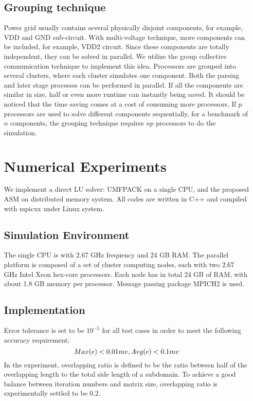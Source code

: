 \documentclass{sig-alternate}
\begin{document}
  \subsection{Grouping technique} 
	Power grid usually contains several physically disjoint components, for example, VDD and GND sub-circuit. With multi-voltage 
	technique, more components can be included, for example, VDD2 circuit. Since these components are totally independent, they can
	be solved in parallel. We utilize the group collective 
	communication technique to implement this idea. Processors are grouped into several clusters, where each cluster 
	simulates one component. Both the parsing and later stage processes can be performed in parallel. 
	If all the components are similar in size, half or even more runtime can instantly being saved. 
	It should be noticed that the time saving comes at a cost of consuming more processors. If $p$ processors are used to 
	solve different components sequentially, for a benchmark of $n$ components, the grouping technique requires $np$ processors to
	do the simulation.  
\section{Numerical Experiments}
	We implement a direct LU solver: UMFPACK on a single CPU, and the proposed ASM on distributed memory system. 
	All codes are written in C++ and compiled with mpicxx under Linux system. 
  \subsection{Simulation Environment}
	The single CPU is with 2.67 GHz frequency and 24 GB RAM. The parallel platform is composed of a set of cluster 
	computing nodes, each with two 2.67 GHz Intel Xeon hex-core processors. Each node has in total 24 GB of RAM, with about 
	1.8 GB memory per processor. Message passing package MPICH2 is used.  
  \subsection{Implementation}
	Error tolerance is set to be $10^{-5}$ for all test cases in order to meet the following accuracy requirement:
	\begin{equation}
		Max(e) < 0.01 mv, Avg(e) < 0.1 mv\\ \label{eq_err}
	\end{equation}
	In the experiment, overlapping ratio is defined to be the ratio between half of the overlapping length to the total side length of 
	a subdomain. To achieve a good balance between iteration numbers and matrix size, overlapping ratio is experimentally 
	settled to be 0.2.
			
\end{document}
